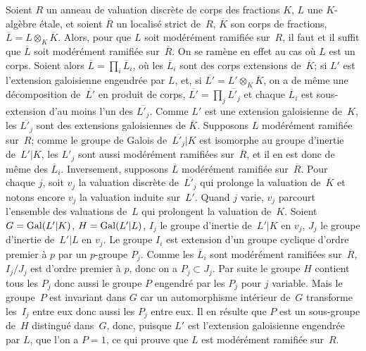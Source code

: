 \subsubsection{}
\label{XIII.2.0.2}
Soient $R$ un anneau de valuation discr\`ete de corps des fractions
$K$, $L$ une $K$-alg\`ebre \'etale, et soient $\overline{R}$ un
localis\'e strict de~$R$, $\overline{K}$ son corps de fractions,
$\overline{L} = L \otimes_K \overline{K}$. Alors, pour que $L$ soit
mod\'er\'ement ramifi\'ee sur~$R$, il faut et il suffit que
$\overline{L}$ soit mod\'er\'ement ramifi\'ee sur~$\overline{R}$. On se ram\`ene en effet au cas o\`u $L$ est un
corps. Soient alors $\overline{L} = \prod_i \overline{L}_i$, o\`u
les $\overline{L}_i$ sont des corps extensions de~$\overline{K}$; si
$L'$ est l'extension galoisienne engendr\'ee par $L$, et, si
$\overline{L'} = L' \otimes_K \overline{K}$,
on a de m\^eme une d\'ecomposition de~$\overline{L'}$ en produit
de corps,
$\overline{L'} = \prod_j \overline{L'_j}$
et chaque $\overline{L}_i$ est sous-extension d'au moins l'un des
$\overline{L'_j}$. Comme $L'$ est une extension galoisienne de~$K$,
les $\overline{L'_j}$ sont des extensions galoisiennes de
$\overline{K}$. Supposons $L$ mod\'er\'ement ramifi\'ee sur~$R$;
comme le groupe de Galois de~$\overline{L'_j}|K$ est isomorphe au
groupe d'inertie de~$L'|K$, les $L'_j$ sont aussi mod\'er\'ement
ramifi\'ees sur~$\overline{R}$, et il en est donc de m\^eme des
$\overline{L}_i$. Inversement, supposons $\overline{L}$
mod\'er\'ement ramifi\'ee sur~$\overline{R}$. Pour chaque $j$,
soit $v_j$ la valuation discr\`ete de~$\overline{L'_j}$ qui prolonge
la valuation de~$\overline{K}$ et notons encore $v_j$ la valuation
induite sur~$L'$. Quand $j$ varie, $v_j$ parcourt l'ensemble des
valuations de~$L$ qui prolongent la valuation de~$K$. Soient $G =
\operatorname{Gal}(L'|K)$, $H=\operatorname{Gal}(L'|L)$, $I_j$ le groupe d'inertie de~$L'|K$ en
$v_j$, $J_j$ le groupe d'inertie de~$L'|L$ en $v_j$. Le groupe $I_i$
est extension d'un groupe cyclique d'ordre premier \`a $p$ par un
$p$-groupe $P_j$. Comme les $\overline{L}_i$ sont mod\'er\'ement
ramifi\'ees sur~$\overline{R}$, $I_j/J_j$ est d'ordre premier \`a
$p$, donc on a $P_j \subset J_j$. Par suite le groupe $H$ contient
tous les $P_j$ donc aussi le groupe $P$ engendr\'e par
les $P_j$ pour $j$ variable. Mais le groupe~$P$ est invariant dans $G$
car un automorphisme int\'erieur de~$G$ transforme les~$I_j$ entre
eux donc aussi les $P_j$ entre eux. Il en r\'esulte que $P$ est un
sous-groupe de~$H$ distingu\'e dans~$G$, donc, puisque $L'$ est
l'extension galoisienne engendr\'ee par $L$, que l'on a $P=1$, ce
qui prouve que $L$ est mod\'er\'ement ramifi\'ee sur~$R$.

